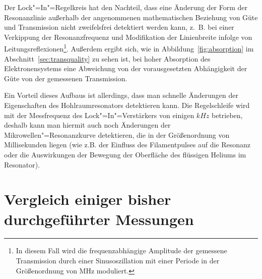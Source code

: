 Der Lock"=In"=Regelkreis hat den Nachteil, dass eine Änderung der Form der Resonanzlinie außerhalb der angenommenen mathematischen Beziehung von Güte und Transmission nicht zweifelsfrei detektiert werden kann, z.~B. bei einer Verkippung der Resonanzfrequenz und Modifikation der Linienbreite infolge von Leitungsreflexionen\footnote{In diesem Fall wird die frequenzabhängige Amplitude der gemessene Transmission durch einer Sinusoszillation mit einer Periode in der Größenordnung von \unit[10]{MHz} moduliert.}. Außerdem ergibt sich, wie in Abbildung~\ref{fig:absorption} im Abschnitt~\ref{sec:transquality} zu sehen ist, bei hoher Absorption des Elektronensystems eine Abweichung von der vorausgesetzten Abhängigkeit der Güte von der gemessenen Transmission. 

Ein Vorteil dieses Aufbaus ist allerdings, dass man schnelle Änderungen der Eigenschaften des Hohlraumresonators detektieren kann. Die Regelschleife wird mit der Messfrequenz des Lock"=In"=Verstärkers von einigen $\unit{kHz}$ betrieben, deshalb kann man hiermit auch noch Änderungen der Mikrowellen"=Resonanzkurve detektieren, die in der Größenordnung von Millisekunden liegen (wie z.B. der Einfluss des Filamentpulses auf die Resonanz oder die Auswirkungen der Bewegung der Oberfläche des flüssigen Heliums im Resonator).

\section{Vergleich einiger bisher durchgeführter Messungen}

